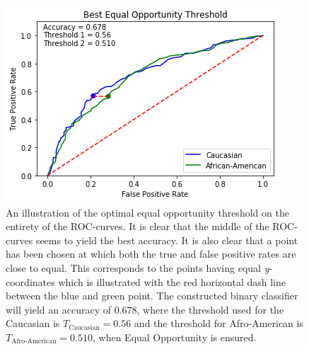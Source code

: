 \documentclass[11pt, fleqn, titlepage]{article}
\begin{document}
\begin{figure}[H]
	\end{figure}

%
	

		
	
	\begin{figure}[H]
		\centering
		\includegraphics[width=0.5\linewidth]{"imgs/Equal Opportunity Optimal"}
		\caption{An illustration of the optimal equal opportunity threshold on the entirety of the ROC-curves. It is clear that the middle of the ROC-curves seems to yield the best accuracy. It is also clear that a point has been chosen at which both the true and false positive rates are close to equal. This corresponds to the points having equal \textit{y}-coordinates which is illustrated with the red horizontal dash line between the blue and green point. The constructed binary classifier will yield an accuracy of $ 0.678 $, where the threshold used for the Caucasian is $T_{\text{Caucasian}}= 0.56 $ and the threshold for Afro-American is $ T_{\text{Afro-American}}=0.510 $, when Equal Opportunity is ensured. }
		\label{fig:equal-opportunity-optimal}
	\end{figure}
\end{document}
